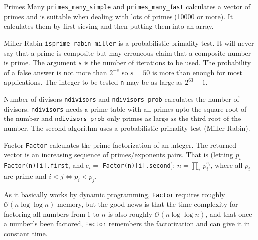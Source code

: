 \begin{algorithm}{Primes Many}
\desc
{\tt primes\_many\_simple} and {\tt primes\_many\_fast}
calculates a vector of primes and is suitable when dealing with lots of
primes (10000 or more). It calculates them by first sieving and then
putting them into an array.
\end{algorithm}

\begin{algorithm}{Miller-Rabin}
\desc
{\tt isprime\_rabin\_miller} is a probabilistic primality
test. It will never say that a prime is composite but may erroneous claim
that a composite number is prime. The argument {\tt s} is the number of
iterations to be used. The probability of a false answer is not more than
$2^{-s}$ so $s=50$ is more than enough for most applications. The integer
to be tested {\tt n} may be as large as $2^{63}-1$.
\end{algorithm}

\begin{algorithm}{Number of divisors}
\desc
{\tt ndivisors} and {\tt ndivisors\_prob} calculates
the number of divisors. {\tt ndivisors} needs a prime-table with all primes
upto the square root of the number and {\tt ndivisors\_prob} only primes as
large as the third root of the number. The second algorithm uses a
probabilistic primality test (Miller-Rabin).
\end{algorithm}

\begin{algorithm}{Factor}
\desc
{\tt Factor} calculates the prime factorization of an integer.
The returned vector is an increasing sequence of primes/exponents pairs.
That is (letting $p_i = $ {\tt Factor(n)[i].first}, and $e_i = $
{\tt Factor(n)[i].second}): $n = \prod_i \, p_i^{e_i}$, where all $p_i$ are
prime and $i < j \Leftrightarrow p_i < p_j$.

As it basically works by dynamic programming, {\tt Factor} requires
roughly $\mathcal{O}(n \log \log n)$ memory, but the good news is that
the time complexity for factoring all numbers from $1$ to $n$ is also
roughly $\mathcal{O}(n \log \log n)$, and that once a number's been
factored, {\tt Factor} remembers the factorization and can give it in
constant time.
\end{algorithm}

